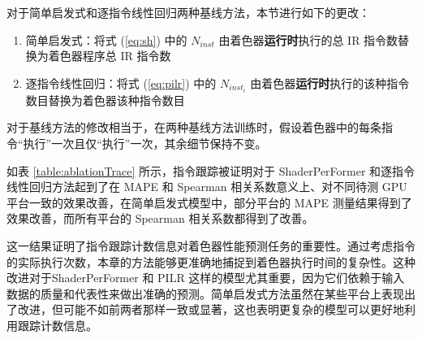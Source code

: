 对于简单启发式和逐指令线性回归两种基线方法，{\amend 本节}进行如下的更改：
\begin{enumerate}
    \item 简单启发式：将式 (\ref{eq:sh}) 中的 $N_{inst}$ 由着色器\textbf{运行时}执行的总 IR 指令数替换为着色器程序总 IR 指令数
    \item 逐指令线性回归：将式 (\ref{eq:pilr}) 中的 $N_{inst_i}$ 由着色器\textbf{运行时}执行的该种指令数目替换为着色器该种指令数目
\end{enumerate}

对于基线方法的修改相当于，在两种基线方法训练时，假设着色器中的每条指令“执行”一次且仅“执行”一次，其余细节保持不变。

如表 \ref{table:ablationTrace} 所示，指令跟踪被证明对于 ShaderPerFormer 和逐指令线性回归方法起到了在 MAPE 和 Spearman 相关系数意义上、对不同待测 GPU 平台一致的效果改善，在简单启发式模型中，部分平台的 MAPE 测量结果得到了效果改善，而所有平台的 Spearman 相关系数都得到了改善。

这一结果证明了指令跟踪计数信息对着色器性能预测任务的重要性。通过考虑指令的实际执行次数，{\amend 本章的}方法能够更准确地捕捉到着色器执行时间的复杂性。这种改进对于ShaderPerFormer 和 PILR 这样{\amend 的}模型尤其重要，因为它们依赖于输入数据的质量和代表性来做出准确的预测。简单启发式方法虽然在某些平台上表现出了改进，但可能不如前两者那样一致或显著，这也表明更复杂的模型可以更好地利用跟踪计数信息。

